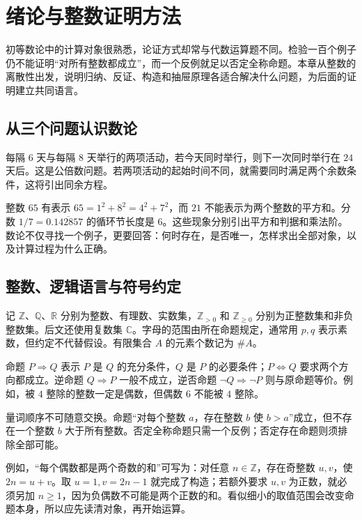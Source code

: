 \setcounter{chapter}{0} %
\chapter{绪论与整数证明方法}
\label{ch:introduction}

初等数论中的计算对象很熟悉，论证方式却常与代数运算题不同。检验一百个例子仍不能证明“对所有整数都成立”，而一个反例就足以否定全称命题。本章从整数的离散性出发，说明归纳、反证、构造和抽屉原理各适合解决什么问题，为后面的证明建立共同语言。

\section{从三个问题认识数论}
\label{sec:intro-questions}

每隔 $6$ 天与每隔 $8$ 天举行的两项活动，若今天同时举行，则下一次同时举行在 $24$ 天后。这是公倍数问题。若两项活动的起始时间不同，就需要同时满足两个余数条件，这将引出同余方程。

整数 $65$ 有表示 $65=1^2+8^2=4^2+7^2$，而 $21$ 不能表示为两个整数的平方和。分数 $1/7=0.\overline{142857}$ 的循环节长度是 $6$。这些现象分别引出平方和判据和乘法阶。数论不仅寻找一个例子，更要回答：何时存在，是否唯一，怎样求出全部对象，以及计算过程为什么正确。

\section{整数、逻辑语言与符号约定}

记 $\mathbb Z$、$\mathbb Q$、$\mathbb R$ 分别为整数、有理数、实数集，$\mathbb Z_{>0}$ 和 $\mathbb Z_{\ge0}$ 分别为正整数集和非负整数集。后文还使用复数集 $\mathbb C$。字母的范围由所在命题规定，通常用 $p,q$ 表示素数，但约定不代替假设。有限集合 $A$ 的元素个数记为 $\#A$。

命题 $P\Rightarrow Q$ 表示 $P$ 是 $Q$ 的充分条件，$Q$ 是 $P$ 的必要条件；$P\Leftrightarrow Q$ 要求两个方向都成立。逆命题 $Q\Rightarrow P$ 一般不成立，逆否命题 $\neg Q\Rightarrow\neg P$ 则与原命题等价。例如，被 $4$ 整除的整数一定是偶数，但偶数 $6$ 不能被 $4$ 整除。

量词顺序不可随意交换。命题“对每个整数 $a$，存在整数 $b$ 使 $b>a$”成立，但不存在一个整数 $b$ 大于所有整数。否定全称命题只需一个反例；否定存在命题则须排除全部可能。

例如，“每个偶数都是两个奇数的和”可写为：对任意 $n\in\mathbb Z$，存在奇整数 $u,v$，使 $2n=u+v$。取 $u=1,v=2n-1$ 就完成了构造；若额外要求 $u,v$ 为正数，就必须另加 $n\ge1$，因为负偶数不可能是两个正数的和。看似细小的取值范围会改变命题本身，所以应先读清对象，再开始运算。

